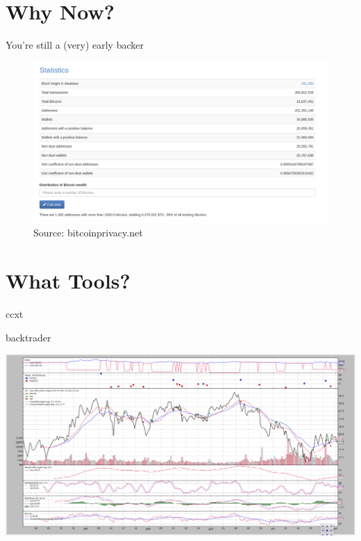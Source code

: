 \documentclass{beamer}
\begin{document}
\section{Why Now?}

\begin{frame}{You're still a (very) early backer}
\pause
  \begin{figure}
    \begin{center}
      \includegraphics[scale=0.21]{images/statistics}
      \caption{Source: bitcoinprivacy.net \cite{NumAdd}}
    \end{center}
  \end{figure}
\end{frame}

\section{What Tools?}

\begin{frame}{ccxt}
  
\end{frame}

\begin{frame}{backtrader}
  \begin{center}
    \includegraphics[scale=0.21]{images/quickstart}
  \end{center}
\end{frame}
\end{document}
